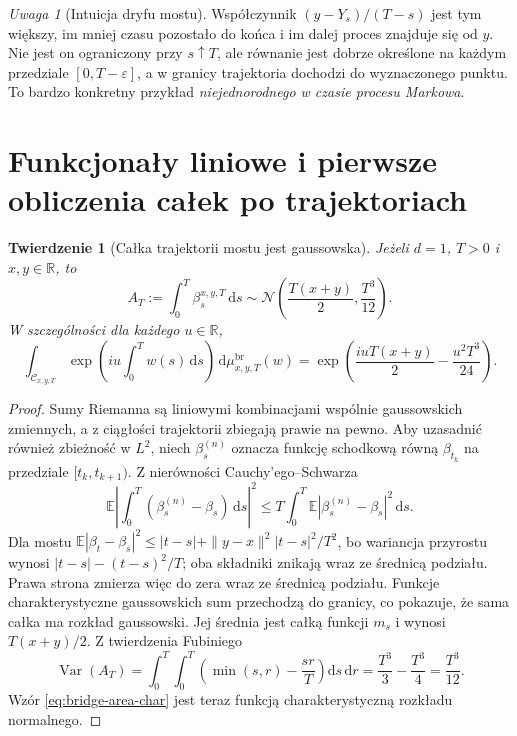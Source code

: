 \documentclass[11pt,a4paper,oneside]{report}
\numberwithin{equation}{chapter}
\theoremstyle{plain}
\newtheorem{twierdzenie}{Twierdzenie}[chapter]
\theoremstyle{definition}
\theoremstyle{remark}
\newtheorem{uwaga}{Uwaga}[chapter]
\newcommand{\R}{\mathbb{R}}
\newcommand{\E}{\mathbb{E}}
\newcommand{\Var}{\operatorname{Var}}
\newcommand{\calC}{\mathcal{C}}
\newcommand{\dd}{\mathrm{d}}
\newcommand{\Normal}{\mathcal{N}}
\begin{document}
\begin{uwaga}[Intuicja dryfu mostu]
Współczynnik $(y-Y_s)/(T-s)$ jest tym większy, im
mniej czasu pozostało do końca i im dalej proces
znajduje się od $y$. Nie jest on ograniczony przy
$s\uparrow T$, ale równanie jest dobrze określone
na każdym przedziale $[0,T-\varepsilon]$, a w granicy
trajektoria dochodzi do wyznaczonego punktu.
To bardzo konkretny przykład \emph{niejednorodnego
w czasie procesu Markowa}.
\end{uwaga}

\section{Funkcjonały liniowe i pierwsze obliczenia całek po trajektoriach}\label{sec:volIII:15:04}

\begin{twierdzenie}[Całka trajektorii mostu jest gaussowska]\label{thm:volIII:15:04}
\label{th:bridge-integrated}
Jeżeli $d=1$, $T>0$ i $x,y\in\R$, to
\[
 A_T:=\int_0^T\beta_s^{x,y,T}\,\dd s
 \sim\Normal\!\left(\frac{T(x+y)}2,\frac{T^3}{12}\right).
\]
W szczególności dla każdego $u\in\R$,
\[
 \int_{\calC_{x,y,T}}\exp\left(iu\int_0^Tw(s)\,\dd s\right)
     \,\dd\mu_{x,y,T}^{\mathrm{br}}(w)
 =\exp\left(\frac{iuT(x+y)}2-\frac{u^2T^3}{24}\right).
 \tag{15.6}\label{eq:bridge-area-char}
\]
\end{twierdzenie}
\begin{proof}
Sumy Riemanna są liniowymi kombinacjami wspólnie
gaussowskich zmiennych, a z ciągłości trajektorii zbiegają
prawie na pewno. Aby uzasadnić również zbieżność w $L^2$,
niech $\beta^{(n)}_s$ oznacza funkcję schodkową równą
$\beta_{t_k}$ na przedziale $[t_k,t_{k+1})$.
Z nierówności Cauchy'ego--Schwarza
\[
\E\left|\int_0^T(\beta^{(n)}_s-\beta_s)\,\dd s\right|^2
\le T\int_0^T\E|\beta^{(n)}_s-\beta_s|^2\,\dd s.
\]
Dla mostu
$\E|\beta_t-\beta_s|^2\le |t-s|+
\|y-x\|^2|t-s|^2/T^2$,
bo wariancja przyrostu wynosi
$|t-s|-(t-s)^2/T$; oba składniki znikają wraz
ze średnicą podziału. Prawa strona
zmierza więc do zera wraz ze średnicą podziału. Funkcje
charakterystyczne gaussowskich sum przechodzą do granicy,
co pokazuje, że sama całka ma rozkład gaussowski.
Jej średnia jest całką funkcji $m_s$ i wynosi
$T(x+y)/2$. Z twierdzenia Fubiniego
\[
 \Var(A_T)=\int_0^T\!\int_0^T
 \left(\min(s,r)-\frac{sr}{T}\right)\dd s\,\dd r
 =\frac{T^3}{3}-\frac{T^3}{4}=\frac{T^3}{12}.
\]
Wzór \eqref{eq:bridge-area-char} jest teraz funkcją
charakterystyczną rozkładu normalnego.
\end{proof}
\end{document}
